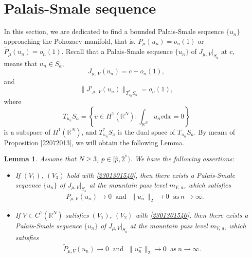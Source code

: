 \documentclass[10pt]{article}
\numberwithin{equation}{section}
\newtheorem{lemma}[theorem]{Lemma}
\newcommand{\ud}{\mathrm{d}}
\numberwithin{equation}{section}
\begin{document}
\section{Palais-Smale sequence}\label{2306251338}
In this section, we are dedicated to find a bounded Palais-Smale sequence $\{u_n\}$ approaching the Pohozaev manifold, that is, $P_\mu(u_n)=o_n(1)$ or $\widetilde{P}_\mu(u_n)=o_n(1)$. Recall that a Palais-Smale sequence $\{u_n\}$ of $J_{\mu,\, V}|_{S_a}$ at $c$, means that $u_n\in S_a$,
\[
J_{\mu,\, V}(u_n)=c+o_n(1),
\]
and
\[
\|J'_{\mu,\, V}(u_n)\|_{T^*_{u_n}S_a}=o_n(1),
\]
where
\[
T_{u_n}S_a=\left\{v\in H^1(\mathbb{R}^N): \int_{\mathbb{R}^N}u_n v \ud x=0\right\}
\]
is a subspace of $H^1(\mathbb{R}^N)$, and $T^{*}_{u_n}S_a$ is the dual space of $T_{u_n}S_a$. By means of Proposition \ref{22072013}, we will obtain the following Lemma.
\begin{lemma}\label{22072020}
Assume that $N\ge 3$, $p\in [\hat{p}, 2^*)$. We have the following assertions:
\begin{itemize}
\item[$(i)$]  If $(V_1)$, $(V_3)$ hold with \eqref{2301301540}, then there exists a Palais-Smale sequence $\{u_n\}$ of $J_{\mu, V}|_{S_a}$ at the mountain pass level ${m}_{V,\, a}$, which satisfies
\begin{equation}\label{22072019}
\begin{aligned}
&P_{\mu, V}(u_n)\to 0\;\;\text{and}\;\;\|u_n^{-}\|_2\to 0\;\; \text{as}~ n\to \infty.
\end{aligned}
\end{equation}
\item[$(ii)$] If $V\in C^1(\mathbb{R}^N)$ satisfies $(V_1)$, $(V_2)$ with \eqref{2301301540}, then there exists a Palais-Smale sequence $\{u_n\}$ of $J_{\mu, V}|_{S_a}$ at the mountain pass level ${m}_{V,\, a}$, which satisfies
\begin{equation}\label{2209112237}
\begin{aligned}
\widetilde{P}_{\mu, V}(u_n)\to 0\;\;\text{and}\;\;\|u_n^{-}\|_2\to 0\;\; \text{as} ~ n\to \infty.
\end{aligned}
\end{equation}
\end{itemize}
\end{lemma}
\end{document}
